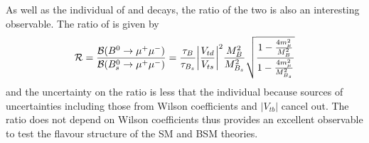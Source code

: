 {As well as the individual \BFs of \bdmumu and \bsmumu decays, the ratio of the two \BFs is also an interesting observable. The ratio of \BFs is given by
\begin{equation}
  \mathcal{R} = \frac{\mathcal{B}(B^{0} \to \mu^{+} \mu^{-})}{\mathcal{B}(B^{0}_{s}\to \mu^{+} \mu^{-})} = \frac{\tau_{B}}{\tau_{B_{s}}} \bigg{|} \frac{V_{td}}{V_{ts}} \bigg{|}^{2} \frac{M_{B}^{2}}{M_{B_{s}}^{2}} \sqrt{\frac{1 - \frac{4m_{\mu}^{2}}{M^{2}_{B}}}{1- \frac{4m_{\mu}^{2}}{M^{2}_{B_{s}}}}} 
\label{eq:BF_ratio}
\end{equation}
and the uncertainty on the ratio is less that the individual \BFs because sources of uncertainties including those from Wilson coefficients and $|V_{tb}|$ cancel out. The ratio does not depend on Wilson coefficients thus provides an excellent observable to test the flavour structure of the SM and BSM theories.


}
